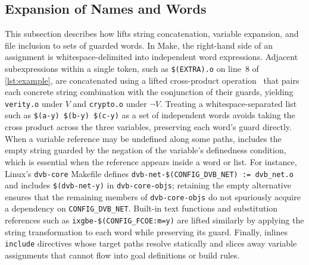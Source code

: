 \documentclass[acmsmall,screen,review,anonymous,nonacm]{acmart}
\begin{document}
  \subsection{Expansion of Names and Words}\label{sec:approach:expand}
  This subsection describes how \tool{} lifts string concatenation, variable expansion, and file inclusion to sets of guarded words.
  In Make, the right-hand side of an assignment is whitespace-delimited into independent word expressions.
  Adjacent subexpressions within a single token, such as \texttt{\$(EXTRA).o} on line~8 of \autoref{lst:example}, are concatenated using a lifted cross-product operation~\cite{gazzillo2017kmax} that pairs each concrete string combination with the conjunction of their guards, yielding \texttt{verity.o} under $V$ and \texttt{crypto.o} under $\neg V$.
  Treating a whitespace-separated list such as \texttt{\$(a-y) \$(b-y) \$(c-y)} as a set of independent words avoids taking the cross product across the three variables, preserving each word's guard directly.
  When a variable reference may be undefined along some paths, \tool{} includes the empty string guarded by the negation of the variable's definedness condition, which is essential when the reference appears inside a word or list.
  For instance, Linux's \texttt{dvb-core} Makefile defines \texttt{dvb-net-\$(CONFIG\_DVB\_NET) := dvb\_net.o} and includes \texttt{\$(dvb-net-y)} in \texttt{dvb-core-objs}; retaining the empty alternative ensures that the remaining members of \texttt{dvb-core-objs} do not spuriously acquire a dependency on \texttt{CONFIG\_DVB\_NET}.
  Built-in text functions and substitution references such as \texttt{ixgbe-\$(CONFIG\_FCOE:m=y)} are lifted similarly by applying the string transformation to each word while preserving its guard.
  Finally, \tool{} inlines \texttt{include} directives whose target paths resolve statically and slices away variable assignments that cannot flow into goal definitions or build rules.
\end{document}
